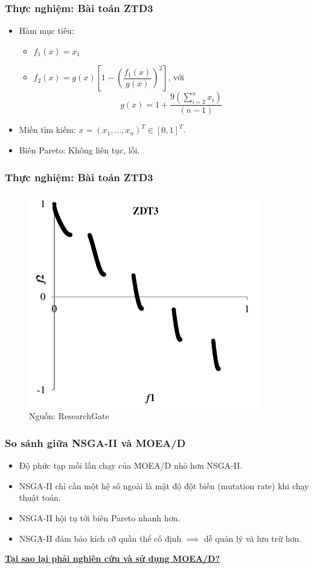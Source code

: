 \documentclass{beamer}
\begin{document}

    \begin{frame}
    \frametitle{\textbf{Thực nghiệm: Bài toán ZTD3}}
        \begin{itemize}
            \item Hàm mục tiêu:
            \begin{itemize}
                \item $ f_1(x) = x_1 $
                \item $ f_2(x) = g(x) \left[ 1 - \left( \dfrac{f_1(x)}{g(x)} \right)^2 \right] $, với
                $$ g(x) = 1 +\dfrac{9 \left( \sum\limits_{i = 2}^n x_i \right)}{(n - 1)} $$
            \end{itemize}
            \item Miền tìm kiếm: $ x = (x_1,..., x_n)^T \in \left[0, 1\right]^T $.
            \item Biên Pareto: Không liên tục, lồi.
        \end{itemize}
    \end{frame}

    \begin{frame} 
    \frametitle{\textbf{Thực nghiệm: Bài toán ZTD3}}
        \begin{figure}[!h]
            \center
            \includegraphics[width=0.5\linewidth]{zdt3-pf}
            \caption{Nguồn: ResearchGate}
        \end{figure}

    \end{frame}

    
    \begin{frame}
    \frametitle{\textbf{So sánh giữa NSGA-II và MOEA/D}}
        \begin{itemize}
            \item Độ phức tạp mỗi lần chạy của MOEA/D nhỏ hơn NSGA-II. \pause
            \item NSGA-II chỉ cần một hệ số ngoài là mật độ đột biến (mutation rate) khi chạy thuật toán. \pause
            \item NSGA-II hội tụ tới biên Pareto nhanh hơn. \pause
            \item NSGA-II đảm bảo kích cỡ quần thể cố định $\implies$ dễ quản lý và lưu trữ hơn. \pause
        \end{itemize}
        \textbf{\href{https://youtu.be/ar0ZAMzuaz4}{Tại sao lại phải nghiên cứu và sử dụng MOEA/D?}}
    \end{frame}
\end{document}

